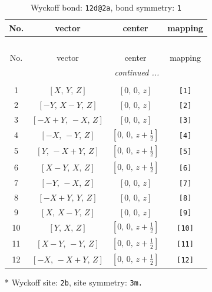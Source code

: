 \documentclass[fleqn,8pt]{jsarticle}
\begin{document}
\begin{longtable}{cccc}
\caption{Wyckoff bond: {\tt 12d@2a}, bond symmetry: {\tt 1}}
 \\
 \hline \hline
No. & vector & center & mapping \\ \hline \endfirsthead

\multicolumn{3}{l}{\tablename\ \thetable{}} \\
 \hline \hline
No. & vector & center & mapping \\ \hline \endhead

 \hline \hline
\multicolumn{3}{r}{\footnotesize\it continued ...} \\ \endfoot

 \hline \hline
\multicolumn{3}{r}{} \\ \endlastfoot

1 & $\left[ X,\, Y,\, Z \right]$ & $\left[ 0,\, 0,\, z \right]$ & {\tt [1]} \\ \hline
2 & $\left[ - Y,\, X - Y,\, Z \right]$ & $\left[ 0,\, 0,\, z \right]$ & {\tt [2]} \\ \hline
3 & $\left[ - X + Y,\, - X,\, Z \right]$ & $\left[ 0,\, 0,\, z \right]$ & {\tt [3]} \\ \hline
4 & $\left[ - X,\, - Y,\, Z \right]$ & $\left[ 0,\, 0,\, z + \frac{1}{2} \right]$ & {\tt [4]} \\ \hline
5 & $\left[ Y,\, - X + Y,\, Z \right]$ & $\left[ 0,\, 0,\, z + \frac{1}{2} \right]$ & {\tt [5]} \\ \hline
6 & $\left[ X - Y,\, X,\, Z \right]$ & $\left[ 0,\, 0,\, z + \frac{1}{2} \right]$ & {\tt [6]} \\ \hline
7 & $\left[ - Y,\, - X,\, Z \right]$ & $\left[ 0,\, 0,\, z \right]$ & {\tt [7]} \\ \hline
8 & $\left[ - X + Y,\, Y,\, Z \right]$ & $\left[ 0,\, 0,\, z \right]$ & {\tt [8]} \\ \hline
9 & $\left[ X,\, X - Y,\, Z \right]$ & $\left[ 0,\, 0,\, z \right]$ & {\tt [9]} \\ \hline
10 & $\left[ Y,\, X,\, Z \right]$ & $\left[ 0,\, 0,\, z + \frac{1}{2} \right]$ & {\tt [10]} \\ \hline
11 & $\left[ X - Y,\, - Y,\, Z \right]$ & $\left[ 0,\, 0,\, z + \frac{1}{2} \right]$ & {\tt [11]} \\ \hline
12 & $\left[ - X,\, - X + Y,\, Z \right]$ & $\left[ 0,\, 0,\, z + \frac{1}{2} \right]$ & {\tt [12]} \\
\end{longtable}
* Wyckoff site: {\tt 2b}, site symmetry: {\tt 3m.}
\end{document}
